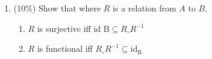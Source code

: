 \documentclass[10pt]{article}
\begin{document}
\begin{enumerate}
  \item (10\%) Show that where $R$ is a relation from $A$ to $B$,
  \begin{enumerate}
    \item $R$ is surjective iff id $\mathrm{B} \subseteq R_{\circ} R^{-1}$

    \item $R$ is functional iff $R_{\circ} R^{-1} \subseteq \mathrm{id}_{\mathrm{B}}$
  \end{enumerate}
\end{enumerate}
\end{document}
